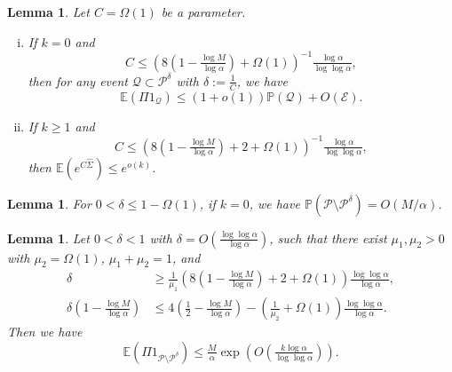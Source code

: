 \documentclass{article}
\theoremstyle{plain}
\theoremstyle{remark}
\theoremstyle{plain}
\newtheorem{lemma}[theorem]{Lemma}
\numberwithin{equation}{section}
\begin{document}
	\begin{lemma}\label{lemma_sigma}
		Let $C=\Omega(1)$ be a parameter.
		\begin{enumerate}[(i)]
			\item\label{lemma_sigma_zero} If $k=0$ and $$C\leq\left(8\left(1-\tfrac{\log M}{\log\alpha}\right)+\Omega(1)\right)^{-1}\tfrac{\log\alpha}{\log\log\alpha},$$ then for any event $\mathcal{Q}\subset\mathcal{P}^{\delta}$ with $\delta:=\tfrac1{C}$, we have $$\mathbb{E}(\Pi1_{\mathcal{Q}})\leq(1+o(1))\mathbb{P}(\mathcal{Q})+O(\mathscr{E}).$$
			\item\label{lemma_sigma_large} If $k\geq1$ and $$C\leq\left(8\left(1-\tfrac{\log M}{\log\alpha}\right)+2+\Omega(1)\right)^{-1}\tfrac{\log\alpha}{\log\log\alpha},$$ then $\mathbb{E}(e^{C\hat{\Sigma}})\leq e^{o(k)}$.
		\end{enumerate}
	\end{lemma}
	
	\begin{lemma}\label{lemma_remaining_p}
		For $0<\delta\leq1-\Omega(1)$, if $k=0$, we have $\mathbb{P}(\mathcal{P}\setminus\mathcal{P}^{\delta})=O(M/\alpha)$.
	\end{lemma}
	
	\begin{lemma}\label{lemma_remaining_e}
		Let $0<\delta<1$ with $\delta=O(\tfrac{\log\log\alpha}{\log\alpha})$, such that there exist $\mu_1,\mu_2>0$ with $\mu_2=\Omega(1)$, $\mu_1+\mu_2=1$, and
		\begin{align}
			\delta&\geq\tfrac1{\mu_1}\left(8\left(1-\tfrac{\log M}{\log\alpha}\right)+2+\Omega(1)\right)\tfrac{\log\log\alpha}{\log\alpha},
			\\\delta\left(1-\tfrac{\log M}{\log\alpha}\right)&\leq4\left(\tfrac12-\tfrac{\log M}{\log\alpha}\right)-(\tfrac{1}{\mu_2}+\Omega(1))\tfrac{\log\log\alpha}{\log\alpha}.
		\end{align}
		Then we have $$\mathbb{E}(\Pi1_{\mathcal{P}\setminus\mathcal{P}^{\delta}})\leq\tfrac{M}{\alpha}\exp\left(O\left(\tfrac{k\log\alpha}{\log\log\alpha}\right)\right).$$
	\end{lemma}
	
\end{document}
